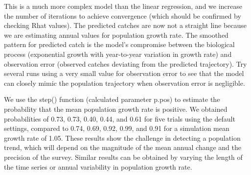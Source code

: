 \documentclass[
]{krantz}
\makeatletter
\newenvironment{Shaded}{\begin{snugshade}}{\end{snugshade}}
\newcommand{\AttributeTok}[1]{\textcolor[rgb]{0.27,0.27,0.27}{#1}}
\newcommand{\CommentTok}[1]{\textcolor[rgb]{0.37,0.37,0.37}{\textit{#1}}}
\newcommand{\DecValTok}[1]{\textcolor[rgb]{0.06,0.06,0.06}{#1}}
\newcommand{\FunctionTok}[1]{\textcolor[rgb]{0.27,0.27,0.27}{\textbf{#1}}}
\newcommand{\NormalTok}[1]{#1}
\newcommand{\OtherTok}[1]{\textcolor[rgb]{0.37,0.37,0.37}{#1}}
\newcommand{\SpecialCharTok}[1]{\textcolor[rgb]{0.43,0.43,0.43}{\textbf{#1}}}
\newcommand{\StringTok}[1]{\textcolor[rgb]{0.5,0.5,0.5}{#1}}
\newenvironment{kframe}{%
\medskip{}
\setlength{\fboxsep}{.8em}
 \def\at@end@of@kframe{}%
 \ifinner\ifhmode%
  \def\at@end@of@kframe{\end{minipage}}%
  \begin{minipage}{\columnwidth}%
 \fi\fi%
 \def\FrameCommand##1{\hskip\@totalleftmargin \hskip-\fboxsep
 \colorbox{shadecolor}{##1}\hskip-\fboxsep
     \hskip-\linewidth \hskip-\@totalleftmargin \hskip\columnwidth}%
 \MakeFramed {\advance\hsize-\width
   \@totalleftmargin\z@ \linewidth\hsize
   \@setminipage}}%
 {\par\unskip\endMakeFramed%
 \at@end@of@kframe}
\renewenvironment{Shaded}{\begin{kframe}}{\end{kframe}}
\makeatother
\begin{document}
\begin{Shaded}
\end{Shaded}

This is a much more complex model than the linear regression, and we increase the number of iterations to achieve convergence (which should be confirmed by checking Rhat values). The predicted catches are now not a straight line because we are estimating annual values for population growth rate. The smoothed pattern for predicted catch is the model's compromise between the biological process (exponential growth with year-to-year variation in growth rate) and observation error (observed catches deviating from the predicted trajectory). Try several runs using a very small value for observation error to see that the model can closely mimic the population trajectory when observation error is negligible.

We use the step() function (calculated parameter p.pos) to estimate the probability that the mean population growth rate is positive. We obtained probabilities of 0.73, 0.73, 0.40, 0.44, and 0.61 for five trials using the default settings, compared to 0.74, 0.69, 0.92, 0.99, and 0.91 for a simulation mean growth rate of 1.05. These results show the challenge in detecting a population trend, which will depend on the magnitude of the mean annual change and the precision of the survey. Similar results can be obtained by varying the length of the time series or annual variability in population growth rate.
\end{document}
